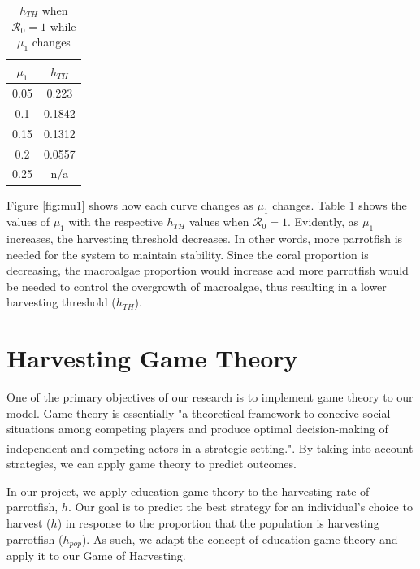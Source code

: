 \documentclass[12pt]{article}
\begin{document}
\begin{table}[H]
    \centering
    \begin{tabular}{c|c}
        $\mu_{1}$ & $h_{TH}$ \\
        \hline
        0.05 & 0.223\\
        0.1 & 0.1842\\
        0.15 & 0.1312\\
        0.2 & 0.0557\\
        0.25 & n/a\\
    \end{tabular}
    \caption{$h_{TH}$ when $\mathscr{R}_{0}=1$ while $\mu_{1}$ changes}
    \label{tab:mu1_sens_analysis_values}
\end{table}

Figure \ref{fig:mu1} shows how each curve changes as $\mu_{1}$ changes. Table \ref{tab:mu1_sens_analysis_values} shows the values of $\mu_{1}$ with the respective $h_{TH}$ values when $\mathscr{R}_{0} = 1$. Evidently, as $\mu_{1}$ increases, the harvesting threshold decreases. In other words, more parrotfish is needed for the system to maintain stability. Since the coral proportion is decreasing, the macroalgae proportion would increase and more parrotfish would be needed to control the overgrowth of macroalgae, thus resulting in a lower harvesting threshold ($h_{TH}$).
    
\section{Harvesting Game Theory}
One of the primary objectives of our research is to implement game theory to our model. Game theory is essentially "a theoretical framework to conceive social situations among competing players and produce optimal decision-making of independent and competing actors in a strategic setting."\textsuperscript{\cite{game_theory_definition}}. By taking into account strategies, we can apply game theory to predict outcomes. \par
In our project, we apply education game theory to the harvesting rate of parrotfish, $h$. Our goal is to predict the best strategy for an individual's choice to harvest ($h$) in response to the proportion that the population is harvesting parrotfish ($h_{pop}$). As such, we adapt the concept of education game theory and apply it to our Game of Harvesting. 
\end{document}
